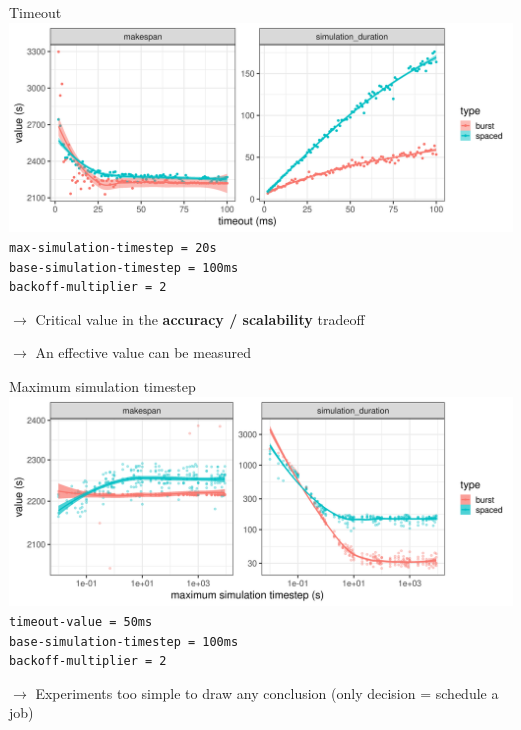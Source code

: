 \documentclass[12pt, aspectratio=43]{beamer}
\begin{document}
\begin{frame}{Timeout}
	\includegraphics[width=\textwidth]{../imgs/timeout_burst_spaced.png}
	{\small \texttt{max-simulation-timestep = 20s}\\
	\texttt{base-simulation-timestep = 100ms}\\
	\texttt{backoff-multiplier = 2}}

	$\rightarrow$ Critical value in the \textbf{accuracy / scalability} tradeoff

	$\rightarrow$ An effective value can be measured
\end{frame}

\begin{frame}{Maximum simulation timestep}
	\includegraphics[width=\textwidth]{../imgs/max-timestep_burst_sp.png}
	{\small \texttt{timeout-value = 50ms}\\
	\texttt{base-simulation-timestep = 100ms}\\
	\texttt{backoff-multiplier = 2}}

	$\rightarrow$ Experiments too simple to draw any conclusion (only decision = schedule a job)
\end{frame}
\end{document}
